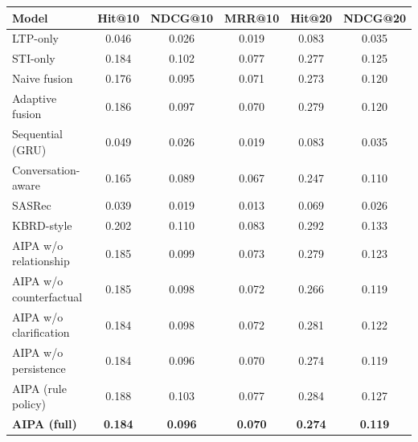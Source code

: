 \begin{tabular}{lccccc}
\toprule
Model & Hit@10 & NDCG@10 & MRR@10 & Hit@20 & NDCG@20 \\
\midrule
LTP-only & 0.046 & 0.026 & 0.019 & 0.083 & 0.035 \\
STI-only & 0.184 & 0.102 & 0.077 & 0.277 & 0.125 \\
Naive fusion & 0.176 & 0.095 & 0.071 & 0.273 & 0.120 \\
Adaptive fusion & 0.186 & 0.097 & 0.070 & 0.279 & 0.120 \\
Sequential (GRU) & 0.049 & 0.026 & 0.019 & 0.083 & 0.035 \\
Conversation-aware & 0.165 & 0.089 & 0.067 & 0.247 & 0.110 \\
SASRec & 0.039 & 0.019 & 0.013 & 0.069 & 0.026 \\
KBRD-style & 0.202 & 0.110 & 0.083 & 0.292 & 0.133 \\
\midrule
AIPA w/o relationship & 0.185 & 0.099 & 0.073 & 0.279 & 0.123 \\
AIPA w/o counterfactual & 0.185 & 0.098 & 0.072 & 0.266 & 0.119 \\
AIPA w/o clarification & 0.184 & 0.098 & 0.072 & 0.281 & 0.122 \\
AIPA w/o persistence & 0.184 & 0.096 & 0.070 & 0.274 & 0.119 \\
AIPA (rule policy) & 0.188 & 0.103 & 0.077 & 0.284 & 0.127 \\
\textbf{AIPA (full)} & \textbf{0.184} & \textbf{0.096} & \textbf{0.070} & \textbf{0.274} & \textbf{0.119} \\
\bottomrule
\end{tabular}
